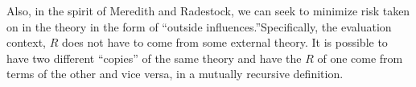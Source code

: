 \documentclass{llncs}
\renewcommand{\:}{\colon}
\begin{document}
Also, in the spirit of Meredith and Radestock, we can seek to minimize
risk taken on in the theory in the form of “outside
influences.”Specifically, the evaluation context, $R$ does not have to
come from some external theory. It is possible to have two different
``copies'' of the same theory and have the $R$ of one come from terms
of the other and vice versa, in a mutually recursive definition.



\end{document}
